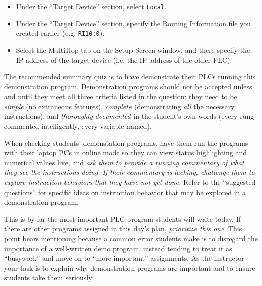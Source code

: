 \begin{itemize}
\vskip 5pt
\item{} Under the ``Target Device'' section, select {\tt Local}.
\vskip 5pt
\item{} Under the ``Target Device'' section, specify the Routing Information file you created earlier (e.g. {\tt RI10:0}).
\vskip 5pt
\item{} Select the MultiHop tab on the Setup Screen window, and there specify the IP address of the target device (i.e. the IP address of the other PLC).
\end{itemize}








The recommended summary quiz is to have  demonstrate their PLCs running this demonstration program.  Demonstration programs should not be accepted unless and until they meet all three criteria listed in the question: they need to be {\it simple} (no extraneous features), {\it complete} (demonstrating {\it all} the necessary instructions), and {\it thoroughly documented} in the student's own words (every rung commented intelligently, every variable named).

\vskip 10pt

When checking students' demonstation programs, have them run the programs with their laptop PCs in online mode so they can view status highlighting and numerical values live, and {\it ask them to provide a running commentary of what they see the instructions doing.  If their commentary is lacking, challenge them to explore instruction behaviors that they have not yet done.}  Refer to the ``suggested questions'' for specific ideas on instruction behavior that may be explored in a demonstration program.




\vskip 10pt

This is by far the most important PLC program students will write today.  If there are other programs assigned in this day's plan, {\it prioritize this one}.  This point bears mentioning because a common error students make is to disregard the importance of a well-written demo program, instead tending to treat it as ``busywork'' and move on to ``more important'' assignments.  As the instructor your task is to explain why demonstration programs are important and to ensure students take them seriously:

